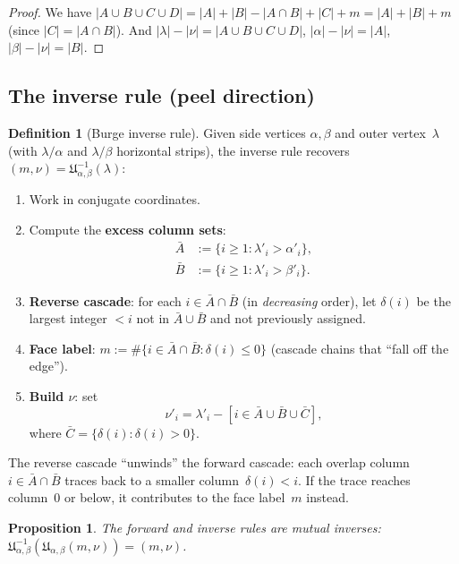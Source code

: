 \documentclass[11pt]{article}
\theoremstyle{plain}
\newtheorem{proposition}[theorem]{Proposition}
\theoremstyle{definition}
\newtheorem{definition}[theorem]{Definition}
\begin{document}
\begin{proof}
We have $|A \cup B \cup C \cup D| = |A| + |B| - |A \cap B| + |C| + m
= |A| + |B| + m$ (since $|C| = |A \cap B|$).  And
$|\lambda| - |\nu| = |A \cup B \cup C \cup D|$,
$|\alpha| - |\nu| = |A|$, $|\beta| - |\nu| = |B|$.
\end{proof}


\subsection{The inverse rule (peel direction)}
\label{sec:inverse}

\begin{definition}[Burge inverse rule]
\label{def:inverse}
Given side vertices $\alpha, \beta$ and outer vertex~$\lambda$ (with
$\lambda/\alpha$ and $\lambda/\beta$ horizontal strips), the inverse
rule recovers $(m, \nu) = \mathfrak{U}^{-1}_{\alpha,\beta}(\lambda)$:
\begin{enumerate}
  \item Work in conjugate coordinates.
  \item Compute the \textbf{excess column sets}:
    \begin{align*}
      \bar{A} &:= \{i \geq 1 : \lambda'_i > \alpha'_i\}, \\
      \bar{B} &:= \{i \geq 1 : \lambda'_i > \beta'_i\}.
    \end{align*}
  \item \textbf{Reverse cascade}: for each $i \in \bar{A} \cap \bar{B}$
    (in \emph{decreasing} order), let $\delta(i)$ be the largest
    integer $< i$ not in $\bar{A} \cup \bar{B}$ and not previously
    assigned.
  \item \textbf{Face label}: $m := \#\{i \in \bar{A} \cap \bar{B}
    : \delta(i) \leq 0\}$ (cascade chains that ``fall off the
    edge'').
  \item \textbf{Build $\nu$}: set
    \[
      \nu'_i = \lambda'_i
        - [i \in \bar{A} \cup \bar{B} \cup \bar{C}],
    \]
    where $\bar{C} = \{\delta(i) : \delta(i) > 0\}$.
\end{enumerate}
\end{definition}

The reverse cascade ``unwinds'' the forward cascade: each overlap
column~$i \in \bar{A} \cap \bar{B}$ traces back to a smaller
column~$\delta(i) < i$.  If the trace reaches column~$0$ or below,
it contributes to the face label~$m$ instead.

\begin{proposition}
\label{prop:inverse}
The forward and inverse rules are mutual inverses:
$\mathfrak{U}^{-1}_{\alpha,\beta}
 (\mathfrak{U}_{\alpha,\beta}(m,\nu)) = (m, \nu)$.
\end{proposition}
\end{document}
